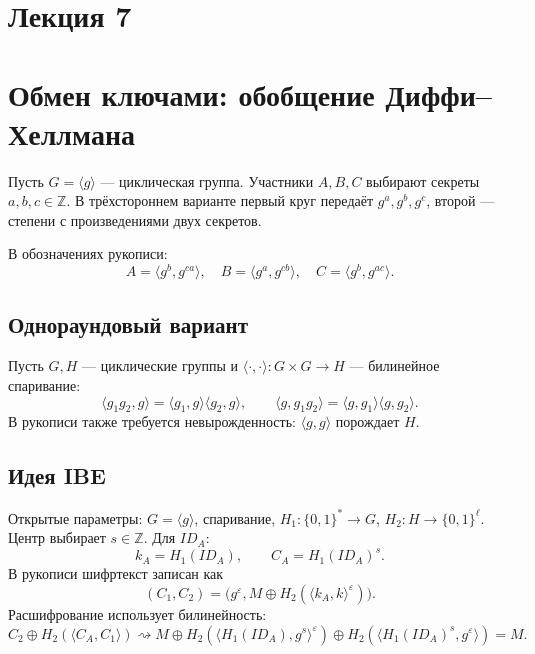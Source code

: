 \documentclass[12pt,a4paper]{article}
\newcommand{\Z}{\mathbb Z}\newcommand{\F}{\mathbb F}\newcommand{\Kbar}{\overline K}
\begin{document}
\section*{\centering Лекция 7}
\section{Обмен ключами: обобщение Диффи--Хеллмана}
Пусть $G=\langle g\rangle$ --- циклическая группа. Участники $A,B,C$ выбирают секреты $a,b,c\in\Z$. В трёхстороннем варианте первый круг передаёт $g^a,g^b,g^c$, второй --- степени с произведениями двух секретов.
\begin{center}\end{center}
В обозначениях рукописи:
\[A=\langle g^b,g^{ca}\rangle,\quad B=\langle g^a,g^{cb}\rangle,\quad C=\langle g^b,g^{ac}\rangle.\]
\subsection*{Однораундовый вариант}
Пусть $G,H$ --- циклические группы и $\langle\cdot,\cdot\rangle:G\times G\to H$ --- билинейное спаривание:
\[\langle g_1g_2,g\rangle=\langle g_1,g\rangle\langle g_2,g\rangle,\qquad \langle g,g_1g_2\rangle=\langle g,g_1\rangle\langle g,g_2\rangle.\]
В рукописи также требуется невырожденность: $\langle g,g\rangle$ порождает $H$.
\subsection*{Идея IBE}
Открытые параметры: $G=\langle g\rangle$, спаривание, $H_1:\{0,1\}^*\to G$, $H_2:H\to\{0,1\}^{\ell}$. Центр выбирает $s\in\Z$. Для $ID_A$:
\[k_A=H_1(ID_A),\qquad C_A=H_1(ID_A)^s.\]
В рукописи шифртекст записан как
\[(C_1,C_2)=\bigl(g^\varepsilon,M\oplus H_2(\langle k_A,k\rangle^\varepsilon)\bigr).\]
Расшифрование использует билинейность:
\[C_2\oplus H_2(\langle C_A,C_1\rangle)\rightsquigarrow M\oplus H_2(\langle H_1(ID_A),g^s\rangle^\varepsilon)\oplus H_2(\langle H_1(ID_A)^s,g^\varepsilon\rangle)=M.\]
\end{document}
